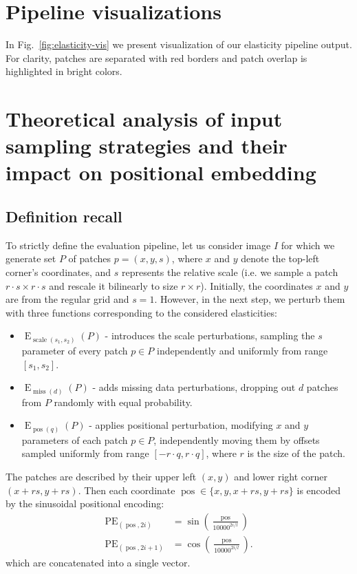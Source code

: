 \documentclass[10pt,twocolumn,letterpaper]{article}
\DeclareMathOperator{\E}{E}
\DeclareMathOperator{\miss}{miss}
\DeclareMathOperator{\scale}{scale}
\DeclareMathOperator{\pos}{pos}
\DeclareMathOperator{\PE}{PE}
\begin{document}
\section{Pipeline visualizations}

In Fig.~\ref{fig:elasticity-vis} we present visualization of our elasticity pipeline output. For clarity, patches are separated with red borders and patch overlap is highlighted in bright colors.



\section{Theoretical analysis of input sampling strategies and their impact on positional embedding}

\subsection{Definition recall}
To strictly define the evaluation pipeline, let us consider image $I$ for which we generate set $P$ of patches $p = (x, y, s)$, where $x$ and $y$ denote the top-left corner's coordinates, and $s$ represents the relative scale (i.e. we sample a patch $r \cdot s \times r \cdot s$ and rescale it bilinearly to size $r \times r$). Initially, the coordinates $x$ and $y$ are from the regular grid and $s=1$. However, in the next step, we perturb them with three functions corresponding to the considered elasticities:
\begin{itemize}
\item $\E_{\scale(s_1, s_2)}(P)$ - introduces the scale perturbations,  sampling the $s$ parameter of every patch $p \in P$ independently and uniformly from range $[s_1, s_2]$.
\item $\E_{\miss(d)}(P)$ - adds missing data perturbations, dropping out $d$ patches from $P$ randomly with equal probability. 
\item $\E_{\pos(q)}(P)$ - applies positional perturbation, modifying $x$ and $y$ parameters of each patch $p \in P$, independently moving them by offsets sampled uniformly from range $[-r \cdot q, r \cdot q]$, where $r$ is the size of the patch.
\end{itemize}

The patches are described by their upper left $(x, y)$ and lower right corner $(x + rs, y+rs)$. Then each coordinate $\pos \in \{x, y, x+rs, y+rs\}$ is encoded by the sinusoidal positional encoding:
\begin{align*}
    \PE_{(\pos,2i)} &= \sin\left(\frac{\pos}{10000^{2i/l}}\right) \\
    \PE_{(\pos,2i+1)} &= \cos\left(\frac{\pos}{10000^{2i/l}}\right).
\end{align*}
which are concatenated into a single vector.
\end{document}
